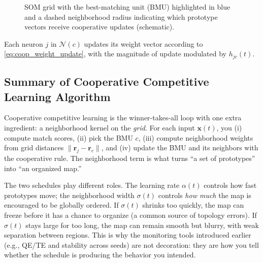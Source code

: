 \begin{figure}[t]
    \centering
    \caption{SOM grid with the best-matching unit (BMU) highlighted in blue and a dashed neighborhood radius indicating which prototype vectors receive cooperative updates (schematic).}
    \label{fig:som_neighborhood}
\end{figure}


Each neuron \(j\) in \(\mathcal{N}(c)\) updates its weight vector according to \eqref{eq:coop_weight_update}, with the magnitude of update modulated by \(h_{j c}(t)\).

\subsection{Summary of Cooperative Competitive Learning Algorithm}
\label{sec:som_summary_of_cooperative_competitive_learning_algorithm}

Cooperative competitive learning is the winner\hyp{}takes\hyp{}all loop with one extra ingredient: a neighborhood kernel on the \emph{grid}. For each input \(\mathbf{x}(t)\), you (i) compute match scores, (ii) pick the BMU \(c\), (iii) compute neighborhood weights from grid distances \(\|\mathbf{r}_j-\mathbf{r}_c\|\), and (iv) update the BMU and its neighbors with the cooperative rule. The neighborhood term is what turns ``a set of prototypes'' into ``an organized map.''

The two schedules play different roles. The learning rate \(\alpha(t)\) controls how fast prototypes move; the neighborhood width \(\sigma(t)\) controls \emph{how much} the map is encouraged to be globally ordered. If \(\sigma(t)\) shrinks too quickly, the map can freeze before it has a chance to organize (a common source of topology errors). If \(\sigma(t)\) stays large for too long, the map can remain smooth but blurry, with weak separation between regions. This is why the monitoring tools introduced earlier (e.g., QE/TE and stability across seeds) are not decoration: they are how you tell whether the schedule is producing the behavior you intended.
